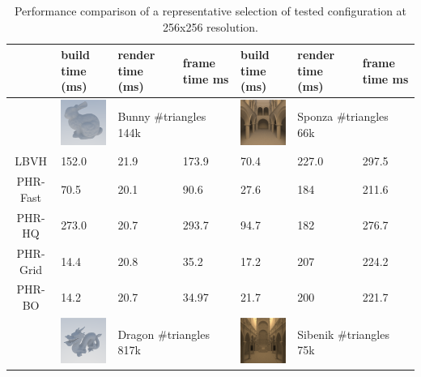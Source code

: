 \begin{table}
\caption{Performance comparison of a representative selection of tested configuration at 256x256 resolution.}
\label{tab:frametime}
\centering
\begin{tabular}{ | c | m{3.5em} | m{3.5em} | m{3.5em} | m{3.5em} | m{3.5em} |  m{3.5em}|}
\hline
& build time (ms) & render time (ms) & frame time ms & build time (ms) & render time (ms) & frame time ms\\
\hline
& \multicolumn{1}{|m{4.5em}}{\includegraphics[width=60pt]{images/bunny.png}} &     \multicolumn{2}{m{4em}|}{Bunny \#triangles 144k} 
& \multicolumn{1}{|m{4.5em}}{\includegraphics[width=60pt]{images/sponza.png}} & \multicolumn{2}{m{4em}|}{Sponza \#triangles 66k}\\
\hline
LBVH & 152.0 & 21.9 & 173.9            & 70.4 & 227.0 & 297.5 \\
PHR-Fast & 70.5 & 20.1 & 90.6          & 27.6 & 184 & 211.6 \\
PHR-HQ & 273.0 & 20.7 & 293.7          &  94.7 & 182 & 276.7\\
\hline
PHR-Grid & 14.4 & 20.8 & 35.2        &  17.2 & 207 & 224.2\\
PHR-BO & 14.2 & 20.7 & 34.97         &  21.7 & 200 & 221.7\\
\hline
& \multicolumn{1}{|m{4.5em}}{\includegraphics[width=60pt]{images/dragon.png}} &     \multicolumn{2}{m{4em}|}{Dragon \#triangles 817k}

& \multicolumn{1}{|m{4.5em}}{\includegraphics[width=60pt]{images/sibenik.png}} & \multicolumn{2}{m{4em}|}{Sibenik \#triangles 75k}\\


\end{tabular}
\end{table}
